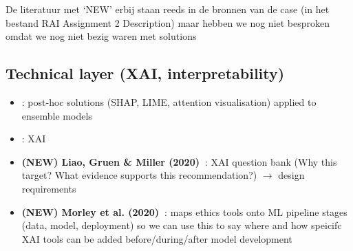 




De literatuur met `NEW' erbij staan reeds in de bronnen van de case (in het bestand RAI Assignment 2 Description) maar hebben we nog niet besproken omdat we nog niet bezig waren met solutions

\subsection{Technical layer (XAI, interpretability)}
\begin{itemize}
	\item \textbf{\citet{arrieta2019explainableartificialintelligencexai}}: post-hoc solutions (SHAP, LIME, attention visualisation) applied to ensemble models
	\item \textbf{\citet{miller2018explanationartificialintelligenceinsights}}: XAI
	\item \textbf{(NEW) Liao, Gruen \& Miller (2020)~\citep{liao2020questioning}}: XAI question bank (Why this target? What evidence supports this recommendation?) $\rightarrow$ design requirements
	\item \textbf{(NEW) Morley et al. (2020)~\citep{morley2020what}}: maps ethics tools onto ML pipeline stages (data, model, deployment) so we can use this to say where and how speicifc XAI tools can be added before/during/after model development
\end{itemize}


